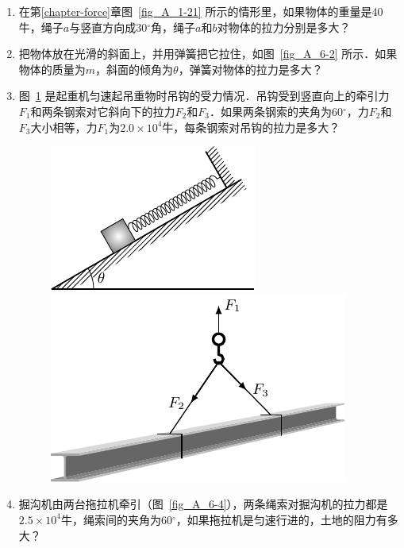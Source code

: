 \begin{enumerate}
    \item 在第\ref{chapter-force}章图~\ref{fig_A_1-21} 所示的情形里，如果物体的重量是40牛，绳子$a$与竖直方向成30$^\circ$角，绳子$a$和$b$对物体的拉力分别是多大？
    \item 把物体放在光滑的斜面上，并用弹簧把它拉住，如图~\ref{fig_A_6-2} 所示．如果物体的质量为$m$，斜面的倾角为$\theta$，弹簧对物体的拉力是多大？
    \item 图~\ref{fig_A_6-3} 是起重机匀速起吊重物时吊钩的受力情况．吊钩受到竖直向上的牵引力$F_1$和两条钢索对它斜向下的拉力$F_2$和$F_3$．如果两条钢索的夹角为60$^\circ$，力$F_2$和$F_3$大小相等，力$F_1$为$2.0\times 10^4$牛，每条钢索对吊钩的拉力是多大？

\begin{figure}[htbp]
    \centering
    \begin{minipage}[t]{0.48\textwidth}
        \centering
        \includegraphics{fig/A/6-2.pdf}
        \caption{}\label{fig_A_6-2}
    \end{minipage}
    \begin{minipage}[t]{0.48\textwidth}
        \centering
        \includegraphics{fig/A/6-3.pdf}
        \caption{}\label{fig_A_6-3}
    \end{minipage}
\end{figure}
    \item 掘沟机由两台拖拉机牵引（图~\ref{fig_A_6-4}），两条绳索对掘沟机的拉力都是$2.5\times 10^4$牛，绳索间的夹角为60$^\circ$，如果拖拉机是匀速行进的，土地的阻力有多大？


\end{enumerate}
